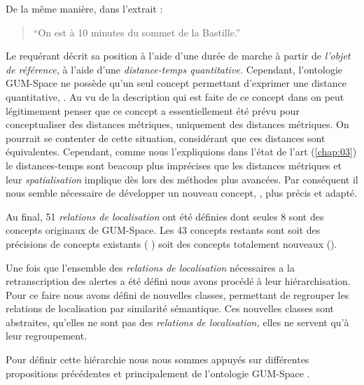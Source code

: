 De la même manière, dans l'extrait :
%
\begin{quote}
  \begin{dialogue}
    \Req \enquote{On est à 10 minutes du sommet de la Bastille.}
  \end{dialogue}
\end{quote}
%
Le requérant décrit sa position à l'aide d'une durée de marche à
partir de \emph{l'objet de référence,} \ie à l'aide d'une
\emph{distance-temps quantitative.} Cependant, l'ontologie GUM-Space
ne possède qu'un seul concept permettant d'exprimer une distance
quantitative, . Au vu de la
description qui est faite de ce concept dans \textcite{Bateman2010} on
peut légitimement penser que ce concept a essentiellement été prévu
pour conceptualiser des distances métriques, uniquement des distances
métriques. On pourrait se contenter de cette situation, considérant
que ces distances sont équivalentes. Cependant, comme nous
l'expliquions dans l'état de l'art (\autoref{chap:03}) le
distances-temps sont beacoup plus imprécises que les distances
métriques et leur \emph{spatialisation} implique dès lors des méthodes
plus avancées. Par conséquent il nous semble nécessaire de développer
un nouveau concept, , plus précis et
adapté.

Au final, 51 \emph{relations de localisation} ont été définies dont
seules 8 sont des concepts originaux de GUM-Space. Les 43 concepts
restants sont soit des précisions de concepts existants (\eg
{}) soit des concepts totalement nouveaux
(\eg {}).

Une fois que l'ensemble des \emph{relations de localisation}
nécessaires a la retranscription des alertes a été défini nous avons
procédé à leur hiérarchisation. Pour ce faire nous avons défini de
nouvelles classes, permettant de regrouper les relations de
localisation par similarité sémantique. Ces nouvelles classes sont
abstraites, \ie qu'elles ne sont pas des \emph{relations de
  localisation,} elles ne servent qu'à leur regroupement.

Pour définir cette hiérarchie nous nous sommes appuyés sur différentes
propositions précédentes et principalement de l'ontologie GUM-Space
\autocite{Bateman2010}.

